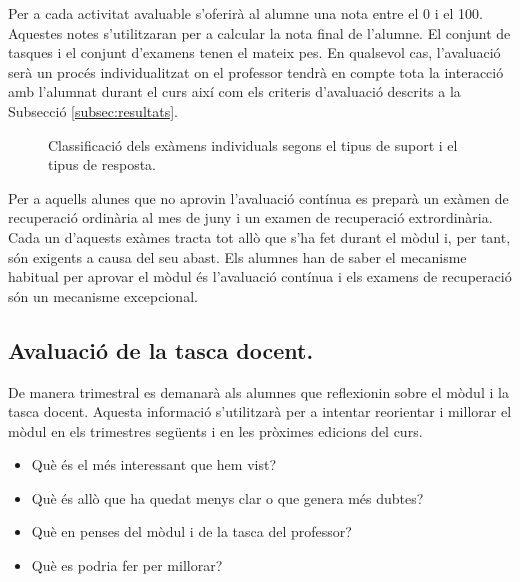 \documentclass[catalan, a4paper, 12pt, titlepage]{article}
\begin{document}
Per a cada activitat avaluable s'oferirà al alumne una nota entre el 0 i el 100.
Aquestes notes s'utilitzaran per a calcular la nota final de l'alumne.
El conjunt de tasques i el conjunt d'examens tenen el mateix pes.
En qualsevol cas, l'avaluació serà un procés individualitzat on el professor tendrà en compte tota la interacció amb l'alumnat durant el curs així com els criteris d'avaluació descrits a la Subsecció \ref{subsec:resultats}.

\begin{figure}
\centering
{}
\caption{Classificació dels exàmens individuals segons el tipus de suport i el tipus de resposta.} \label{fig:M1}
\end{figure}

Per a aquells alunes que no aprovin l'avaluació contínua es preparà un exàmen de recuperació ordinària al mes de juny i un examen de recuperació extrordinària. Cada un d'aquests exàmes tracta tot allò que s'ha fet durant el mòdul i, per tant, són exigents a causa del seu abast. Els alumnes han de saber el mecanisme habitual per aprovar el mòdul és l'avaluació contínua i els examens de recuperació són un mecanisme excepcional.

\subsection{Avaluació de la tasca docent.}

De manera trimestral es demanarà als alumnes que reflexionin sobre el mòdul i la tasca docent. Aquesta informació s'utilitzarà per a intentar reorientar i millorar el mòdul en els trimestres següents i en les pròximes edicions del curs. 

\begin{itemize}
	\item Què és el més interessant que hem vist?
	\item Què és allò que ha quedat menys clar o que genera més dubtes?
	\item Què en penses del mòdul i de la tasca del professor?
	\item Què es podria fer per millorar?
\end{itemize}
\end{document}
